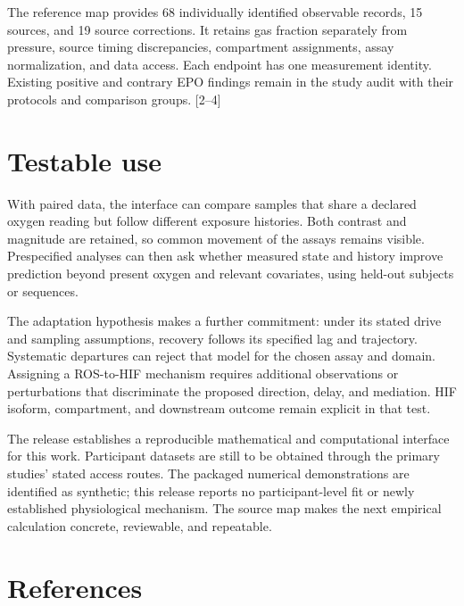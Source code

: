 \documentclass[11pt]{article}
\begin{document}
The reference map provides 68 individually identified observable
records, 15 sources, and 19 source corrections. It retains gas fraction
separately from pressure, source timing discrepancies, compartment
assignments, assay normalization, and data access. Each endpoint has one
measurement identity. Existing positive and contrary EPO findings remain
in the study audit with their protocols and comparison groups.
{[}2--4{]}

\section*{Testable use}\label{testable-use}

With paired data, the interface can compare samples that share a
declared oxygen reading but follow different exposure histories. Both
contrast and magnitude are retained, so common movement of the assays
remains visible. Prespecified analyses can then ask whether measured
state and history improve prediction beyond present oxygen and relevant
covariates, using held-out subjects or sequences.

The adaptation hypothesis makes a further commitment: under its stated
drive and sampling assumptions, recovery follows its specified lag and
trajectory. Systematic departures can reject that model for the chosen
assay and domain. Assigning a ROS-to-HIF mechanism requires additional
observations or perturbations that discriminate the proposed direction,
delay, and mediation. HIF isoform, compartment, and downstream outcome
remain explicit in that test.

The release establishes a reproducible mathematical and computational
interface for this work. Participant datasets are still to be obtained
through the primary studies' stated access routes. The packaged
numerical demonstrations are identified as synthetic; this release
reports no participant-level fit or newly established physiological
mechanism. The source map makes the next empirical calculation concrete,
reviewable, and repeatable.

\section*{References}\label{references}
\end{document}
